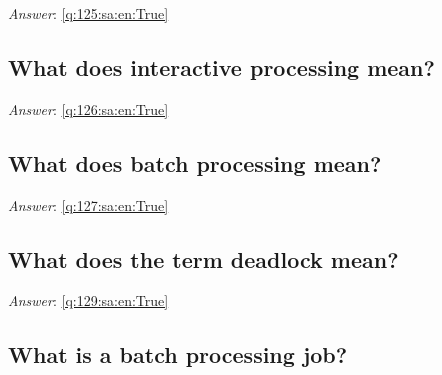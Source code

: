 \documentclass[a4paper,11pt,oneside]{article}
\begin{document}
\begin{sloppypar}
\textit{Answer}: \autoref{q:125:sa:en:True}



\subsection{What does interactive processing mean?}

\label{q:126:sa:en:False}

\vspace{2cm}

\noindent\makebox[\textwidth]{\hrulefill}

\vspace{1cm}

\textit{Answer}: \autoref{q:126:sa:en:True}



\subsection{What does batch processing mean?}

\label{q:127:sa:en:False}

\vspace{2cm}

\noindent\makebox[\textwidth]{\hrulefill}

\vspace{1cm}

\textit{Answer}: \autoref{q:127:sa:en:True}



\subsection{What does the term deadlock mean?}

\label{q:129:sa:en:False}

\vspace{2cm}

\noindent\makebox[\textwidth]{\hrulefill}

\vspace{1cm}

\textit{Answer}: \autoref{q:129:sa:en:True}



\subsection{What is a batch processing job?}

\label{q:130:sa:en:False}

\vspace{2cm}


\end{sloppypar}
\end{document}
